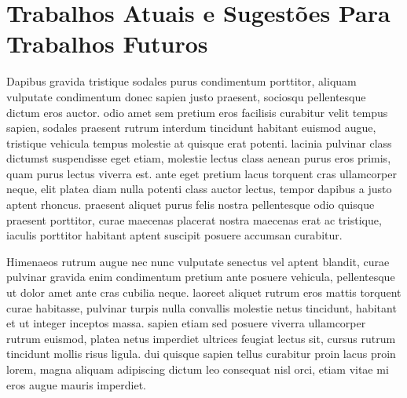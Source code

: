 	 

\section{Trabalhos Atuais e Sugestões Para Trabalhos Futuros}

Dapibus gravida tristique sodales purus condimentum porttitor, aliquam vulputate condimentum donec sapien justo praesent, sociosqu pellentesque dictum eros auctor. odio amet sem pretium eros facilisis curabitur velit tempus sapien, sodales praesent rutrum interdum tincidunt habitant euismod augue, tristique vehicula tempus molestie at quisque erat potenti. lacinia pulvinar class dictumst suspendisse eget etiam, molestie lectus class aenean purus eros primis, quam purus lectus viverra est. ante eget pretium lacus torquent cras ullamcorper neque, elit platea diam nulla potenti class auctor lectus, tempor dapibus a justo aptent rhoncus. praesent aliquet purus felis nostra pellentesque odio quisque praesent porttitor, curae maecenas placerat nostra maecenas erat ac tristique, iaculis porttitor habitant aptent suscipit posuere accumsan curabitur. 

Himenaeos rutrum augue nec nunc vulputate senectus vel aptent blandit, curae pulvinar gravida enim condimentum pretium ante posuere vehicula, pellentesque ut dolor amet ante cras cubilia neque. laoreet aliquet rutrum eros mattis torquent curae habitasse, pulvinar turpis nulla convallis molestie netus tincidunt, habitant et ut integer inceptos massa. sapien etiam sed posuere viverra ullamcorper rutrum euismod, platea netus imperdiet ultrices feugiat lectus sit, cursus rutrum tincidunt mollis risus ligula. dui quisque sapien tellus curabitur proin lacus proin lorem, magna aliquam adipiscing dictum leo consequat nisl orci, etiam vitae mi eros augue mauris imperdiet.